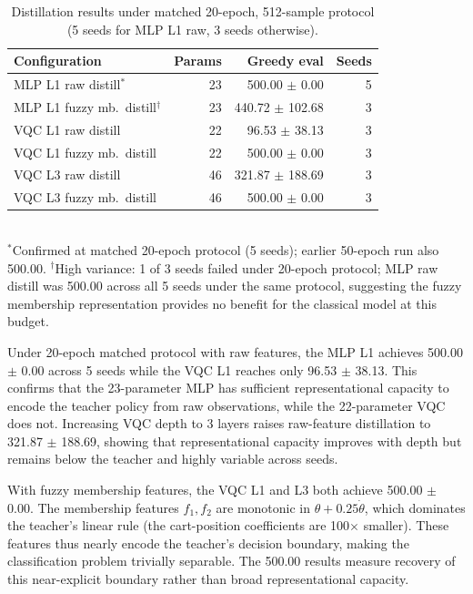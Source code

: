 \begin{table}[t]
  \centering
  \caption{Distillation results under matched 20-epoch, 512-sample protocol (5 seeds for MLP L1 raw, 3 seeds otherwise).}
  \label{tab:fuzzy-distill}
  \begin{tabular}{lrrr}
    \hline
    Configuration & Params & Greedy eval & Seeds \\
    \hline
    MLP L1 raw distill$^*$ & 23 & 500.00 $\pm$ 0.00 & 5 \\
    MLP L1 fuzzy mb.\ distill$^\dagger$ & 23 & 440.72 $\pm$ 102.68 & 3 \\
    VQC L1 raw distill & 22 & 96.53 $\pm$ 38.13 & 3 \\
    VQC L1 fuzzy mb.\ distill & 22 & 500.00 $\pm$ 0.00 & 3 \\
    VQC L3 raw distill & 46 & 321.87 $\pm$ 188.69 & 3 \\
    VQC L3 fuzzy mb.\ distill & 46 & 500.00 $\pm$ 0.00 & 3 \\
    \hline
  \end{tabular}
  \smallskip\\
  {\scriptsize $^*$Confirmed at matched 20-epoch protocol (5 seeds); earlier 50-epoch run also 500.00. $^\dagger$High variance: 1 of 3 seeds failed under 20-epoch protocol; MLP raw distill was 500.00 across all 5 seeds under the same protocol, suggesting the fuzzy membership representation provides no benefit for the classical model at this budget.}
\end{table}

Under 20-epoch matched protocol with raw features, the MLP L1 achieves 500.00
$\pm$ 0.00 across 5 seeds while the VQC L1 reaches only 96.53 $\pm$ 38.13.
This confirms that the 23-parameter MLP has sufficient representational capacity
to encode the teacher policy from raw observations, while the 22-parameter VQC
does not. Increasing VQC depth to 3 layers raises raw-feature distillation to
321.87 $\pm$ 188.69, showing that representational capacity improves with depth
but remains below the teacher and highly variable across seeds.

With fuzzy membership features, the VQC L1 and L3 both achieve 500.00 $\pm$
0.00. The membership features $f_1, f_2$ are monotonic in $\theta +
0.25\dot{\theta}$, which dominates the teacher's linear rule (the cart-position
coefficients are 100$\times$ smaller). These features thus nearly encode the
teacher's decision boundary, making the classification problem trivially
separable. The 500.00 results measure recovery of this near-explicit boundary
rather than broad representational capacity.

